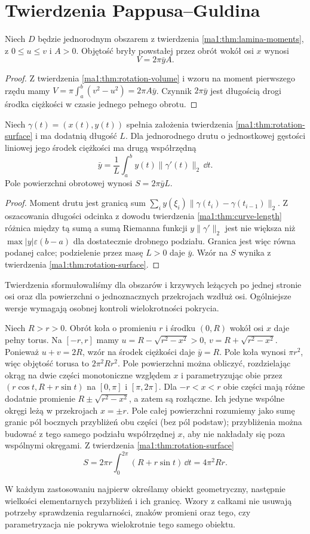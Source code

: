 \section{Twierdzenia Pappusa--Guldina}
\begin{twierdzenie}
\label{ma1:thm:pappus-volume}
Niech $D$ będzie jednorodnym obszarem z twierdzenia \ref{ma1:thm:lamina-moments}, z $0\le u\le v$ i $A>0$. Objętość bryły powstałej przez obrót wokół osi $x$ wynosi
\[
 V=2\pi\bar y A.
\]
\end{twierdzenie}
\begin{proof}
Z twierdzenia \ref{ma1:thm:rotation-volume} i wzoru na moment pierwszego rzędu mamy $V=\pi\int_a^b(v^2-u^2)=2\pi A\bar y$. Czynnik $2\pi\bar y$ jest długością drogi środka ciężkości w czasie jednego pełnego obrotu.
\end{proof}
\begin{twierdzenie}
\label{ma1:thm:pappus-surface}
Niech $\gamma(t)=(x(t),y(t))$ spełnia założenia twierdzenia \ref{ma1:thm:rotation-surface} i ma dodatnią długość $L$. Dla jednorodnego drutu o jednostkowej gęstości liniowej jego środek ciężkości ma drugą współrzędną
\[
 \bar y=\frac1L\int_a^b y(t)\|\gamma'(t)\|_2\,\dd t.
\]
Pole powierzchni obrotowej wynosi $S=2\pi\bar y L$.
\end{twierdzenie}
\begin{proof}
Moment drutu jest granicą sum $\sum_i y(\xi_i)\|\gamma(t_i)-\gamma(t_{i-1})\|_2$. Z oszacowania długości odcinka z dowodu twierdzenia \ref{ma1:thm:curve-length} różnica między tą sumą a sumą Riemanna funkcji $y\|\gamma'\|_2$ jest nie większa niż $\max|y|\varepsilon(b-a)$ dla dostatecznie drobnego podziału. Granica jest więc równa podanej całce; podzielenie przez masę $L>0$ daje $\bar y$. Wzór na $S$ wynika z twierdzenia \ref{ma1:thm:rotation-surface}.
\end{proof}
Twierdzenia sformułowaliśmy dla obszarów i krzywych leżących po jednej stronie osi oraz dla powierzchni o jednoznacznych przekrojach wzdłuż osi. Ogólniejsze wersje wymagają osobnej kontroli wielokrotności pokrycia.

\begin{przyklad}
\label{ma1:ex:torus-volume}
Niech $R>r>0$. Obrót koła o promieniu $r$ i środku $(0,R)$ wokół osi $x$ daje pełny torus. Na $[-r,r]$ mamy $u=R-\sqrt{r^2-x^2}>0$, $v=R+\sqrt{r^2-x^2}$. Ponieważ $u+v=2R$, wzór na środek ciężkości daje $\bar y=R$. Pole koła wynosi $\pi r^2$, więc objętość torusa to $2\pi^2Rr^2$. Pole powierzchni można obliczyć, rozdzielając okrąg na dwie części monotoniczne względem $x$ i parametryzując obie przez $(r\cos t,R+r\sin t)$ na $[0,\pi]$ i $[\pi,2\pi]$. Dla $-r<x<r$ obie części mają różne dodatnie promienie $R\pm\sqrt{r^2-x^2}$, a zatem są rozłączne. Ich jedyne wspólne okręgi leżą w przekrojach $x=\pm r$. Pole całej powierzchni rozumiemy jako sumę granic pól bocznych przybliżeń obu części (bez pól podstaw); przybliżenia można budować z tego samego podziału współrzędnej $x$, aby nie nakładały się poza wspólnymi okręgami. Z twierdzenia \ref{ma1:thm:rotation-surface}
\[
 S=2\pi r\int_0^{2\pi}(R+r\sin t)\,\dd t=4\pi^2Rr.
\]
\end{przyklad}

W każdym zastosowaniu najpierw określamy obiekt geometryczny, następnie wielkości elementarnych przybliżeń i ich granicę. Wzory z całkami nie usuwają potrzeby sprawdzenia regularności, znaków promieni oraz tego, czy parametryzacja nie pokrywa wielokrotnie tego samego obiektu.
